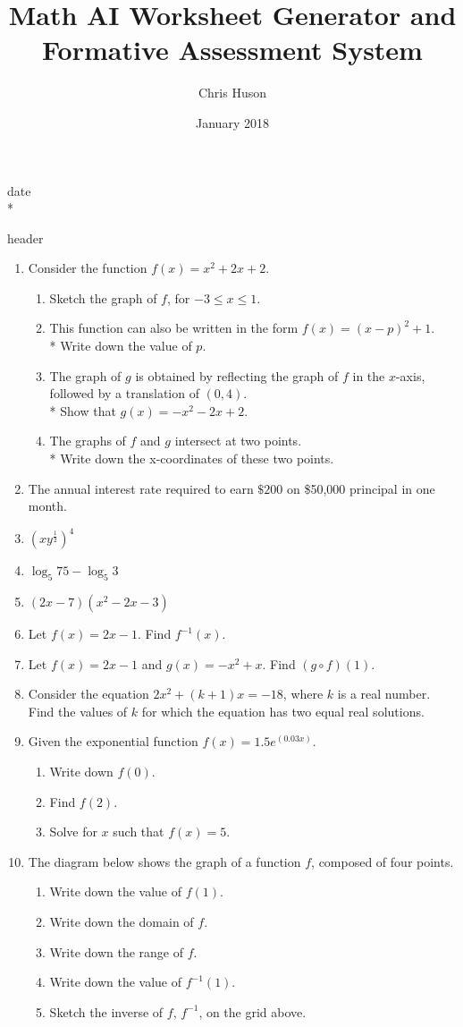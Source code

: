 \documentclass[12pt, oneside]{article}
\title{Math AI Worksheet Generator and Formative Assessment System}
\author{Chris Huson}
\date{January 2018}
\begin{document}
date\\*
\begin{center}{header}\end{center}
\begin{enumerate}
\item Consider the function $f(x)=x^2+2x+2$.
\begin{enumerate}
    \item Sketch the graph of $f$, for $-3 \leq x \leq 1$.
    \item This function can also be written in the form $f(x)=(x-p)^2 +1$.\\* 
    Write down the value of $p$.
    \item The graph of $g$ is obtained by reflecting the graph of $f$ in the $x$-axis, followed by a translation of $(0, 4)$.\\* Show that $g(x)=-x^2-2x+2$.
    \item The graphs of $f$ and $g$ intersect at two points.\\*
    Write down the x-coordinates of these two points.
\end{enumerate}\item The annual interest rate required to earn $\$200$ on \$50,000 principal in one month.\item $\displaystyle \left( x y^{\frac{1}{2}}\right)^4$\item $\log_5 75 - \log_5 3$\item $(2x-7)(x^2-2x-3)$\item Let $f(x)=2x-1$. Find $f^{-1}(x)$.\item Let $f(x)=2x-1$ and $g(x)=-x^2+x$. Find $(g \circ f)(1)$.\item Consider the equation $2x^2 + (k+1)x=-18$, where $k$ is a real number. Find the values of $k$ for which the equation has two equal real solutions.\item Given the exponential function $\displaystyle f(x)=1.5e^{(0.03x)}$.
\begin{enumerate}
    \item Write down $f(0)$.
    \item Find $f(2)$. %
    \item Solve for $x$ such that $f(x)=5$. %
\end{enumerate}\item The diagram below shows the graph of a function $f$, composed of four points. \begin{enumerate}
    \item Write down the value of $f(1)$.
    \item Write down the domain of $f$.
    \item Write down the range of $f$.
    \item Write down the value of $f^{-1}(1)$.
    \item Sketch the inverse of $f$, $f^{-1}$, on the grid above.
\end{enumerate}\end{enumerate}
\end{document}
